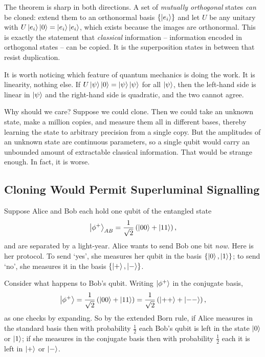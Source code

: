 \documentclass[a4paper]{scrartcl}
\begin{document}
The theorem is sharp in both directions. A set of \emph{mutually orthogonal} states \emph{can} be cloned: extend them to an orthonormal basis $\{\ket{e_i}\}$ and let $U$ be any unitary with $U\ket{e_i}\ket{0} = \ket{e_i}\ket{e_i}$, which exists because the images are orthonormal. This is exactly the statement that \emph{classical} information -- information encoded in orthogonal states -- can be copied. It is the superposition states in between that resist duplication.

\begin{remark}
	It is worth noticing which feature of quantum mechanics is doing the work. It is linearity, nothing else. If $U\ket{\psi}\ket{0} = \ket{\psi}\ket{\psi}$ for all $\ket{\psi}$, then the left-hand side is linear in $\ket{\psi}$ and the right-hand side is quadratic, and the two cannot agree.
\end{remark}

Why should we care? Suppose we could clone. Then we could take an unknown state, make a million copies, and measure them all in different bases, thereby learning the state to arbitrary precision from a single copy. But the amplitudes of an unknown state are continuous parameters, so a single qubit would carry an unbounded amount of extractable classical information. That would be strange enough. In fact, it is worse.

\subsection{Cloning Would Permit Superluminal Signalling}\label{sec:cloningsignal}

Suppose Alice and Bob each hold one qubit of the entangled state
$$\ket{\phi^+}_{AB} = \frac{1}{\sqrt2}\left(\ket{00} + \ket{11}\right),$$
and are separated by a light-year. Alice wants to send Bob one bit \emph{now}. Here is her protocol. To send `yes', she measures her qubit in the basis $\{\ket{0},\ket{1}\}$; to send `no', she measures it in the basis $\{\ket{+},\ket{-}\}$.

Consider what happens to Bob's qubit. Writing $\ket{\phi^+}$ in the conjugate basis,
$$\ket{\phi^+} = \frac{1}{\sqrt2}\left(\ket{00}+\ket{11}\right) = \frac{1}{\sqrt2}\left(\ket{++} + \ket{--}\right),$$
as one checks by expanding. So by the extended Born rule, if Alice measures in the standard basis then with probability $\tfrac12$ each Bob's qubit is left in the state $\ket{0}$ or $\ket{1}$; if she measures in the conjugate basis then with probability $\tfrac12$ each it is left in $\ket{+}$ or $\ket{-}$.
\end{document}
